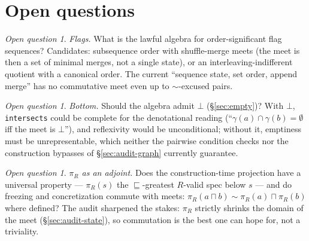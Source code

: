 \documentclass[11pt]{article}
\theoremstyle{definition}
\theoremstyle{remark}
\newtheorem{openq}[theorem]{Open question}
\newcommand{\sat}{\sqsubseteq}
\renewcommand{\ker}{\sim}
\newcommand{\meet}{\sqcap}
\newcommand{\den}[1]{\gamma(#1)}
\newcommand{\code}[1]{\texttt{#1}}
\begin{document}
\section{Open questions}\label{sec:open}

\begin{openq}
\emph{Flags.}  What is the lawful algebra for order-significant flag
sequences?  Candidates: subsequence order with shuffle-merge meets (the meet
is then a set of minimal merges, not a single state), or an
interleaving-indifferent quotient with a canonical order.  The current
``sequence state, set order, append merge'' has no commutative meet even up
to $\ker$-excused pairs.
\end{openq}

\begin{openq}
\emph{Bottom.}  Should the algebra admit $\bot$ (\S\ref{sec:empty})?  With
$\bot$, \code{intersects} could be complete for the denotational reading
(``$\den{a} \cap \den{b} = \emptyset$ iff the meet is $\bot$''), and
reflexivity would be unconditional; without it, emptiness must be
unrepresentable, which neither the pairwise condition checks nor the
construction bypasses of \S\ref{sec:audit-graph} currently guarantee.
\end{openq}

\begin{openq}
\emph{$\pi_R$ as an adjoint.}  Does the construction-time projection have a
universal property --- $\pi_R(s)$ the $\sat$-greatest $R$-valid spec below
$s$ --- and do freezing and concretization commute with meets:
$\pi_R(a \meet b) \ker \pi_R(a) \meet \pi_R(b)$ where defined?  The audit
sharpened the stakes: $\pi_R$ strictly shrinks the domain of the meet
(\S\ref{sec:audit-state}), so commutation is the best one can hope for, not
a triviality.
\end{openq}
\end{document}
